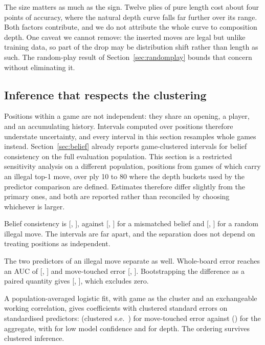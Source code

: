 The size matters as much as the sign. Twelve plies of pure length cost about four
points of accuracy, where the natural depth curve falls far further over its
range. Both factors contribute, and we do not attribute the whole curve to
composition depth. One caveat we cannot remove: the inserted moves are legal but
unlike training data, so part of the drop may be distribution shift rather than
length as such. The random-play result of Section~\ref{sec:randomplay} bounds
that concern without eliminating it.


\subsection{Inference that respects the clustering}
\label{sec:stats}

Positions within a game are not independent: they share an opening, a player, and
an accumulating history. Intervals computed over positions therefore understate
uncertainty, and every interval in this section resamples whole games instead.
Section~\ref{sec:belief} already reports game-clustered intervals for belief
consistency on the full evaluation population. This section is a restricted
sensitivity analysis on a different population,  positions from
 games of which  carry an illegal top-1 move, over
ply 10 to 80 where the depth buckets used by the predictor comparison are
defined. Estimates therefore differ slightly from the primary ones, and both are
reported rather than reconciled by choosing whichever is larger.



Belief consistency is  [, ], against
 [, ] for a mismatched
belief and  [, ] for a
random illegal move. The intervals are far apart, and the separation does not
depend on treating positions as independent.

The two predictors of an illegal move separate as well. Whole-board error reaches
an AUC of  [, ] and
move-touched error  [,
]. Bootstrapping the difference as a paired quantity gives
 [, ], which excludes
zero.

A population-averaged logistic fit, with game as the cluster and an exchangeable
working correlation, gives coefficients with clustered standard errors on standardised
predictors:  (clustered s.e.\ ) for move-touched
error against  () for the aggregate, with
 for low model confidence and  for depth. The
ordering survives clustered inference.

